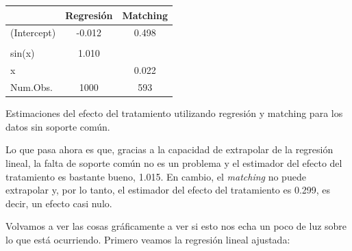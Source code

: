 \documentclass[
  letterpaper,
  DIV=11,
  numbers=noendperiod,
  oneside]{scrreprt}
\begin{document}
\begin{table}
\fontsize{12.0pt}{14.4pt}\selectfont
\begin{tabular*}{\linewidth}{@{\extracolsep{\fill}}lcc}
\toprule
  & Regresión & Matching \\ 
\midrule\addlinespace[2.5pt]
(Intercept) & -0.012 & 0.498 \\ 
{\bfseries \cellcolor[HTML]{rgba(255,255,224,0.8)}{\textcolor[HTML]{000000}{Tratamiento}}} & {\bfseries \cellcolor[HTML]{rgba(255,255,224,0.8)}{\textcolor[HTML]{000000}{1.015}}} & {\bfseries \cellcolor[HTML]{rgba(255,255,224,0.8)}{\textcolor[HTML]{000000}{0.299}}} \\ 
sin(x) & 1.010 &  \\ 
{x} & {} & {0.022} \\ 
Num.Obs. & 1000 & 593 \\ 
\bottomrule
\end{tabular*}
\end{table}

Estimaciones del efecto del tratamiento utilizando regresión y matching
para los datos sin soporte común.

Lo que pasa ahora es que, gracias a la capacidad de extrapolar de la
regresión lineal, la falta de soporte común no es un problema y el
estimador del efecto del tratamiento es bastante bueno, 1.015. En
cambio, el \emph{matching} no puede extrapolar y, por lo tanto, el
estimador del efecto del tratamiento es 0.299, es decir, un efecto casi
nulo.

Volvamos a ver las cosas gráficamente a ver si esto nos echa un poco de
luz sobre lo que está ocurriendo. Primero veamos la regresión lineal
ajustada:
\end{document}
